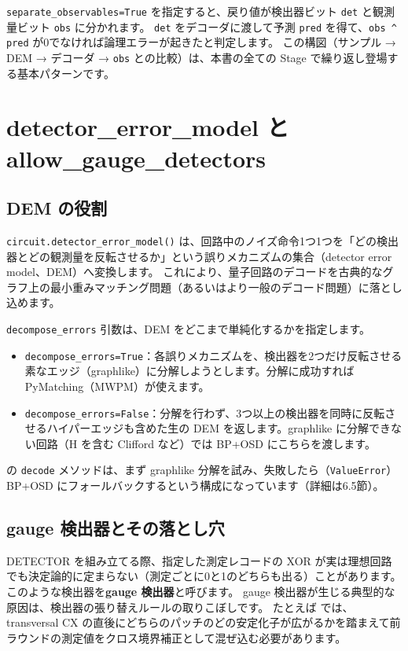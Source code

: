 \texttt{separate\_observables=True} を指定すると、戻り値が検出器ビット \texttt{det} と観測量ビット \texttt{obs} に分かれます。
\texttt{det} をデコーダに渡して予測 \texttt{pred} を得て、\verb|obs ^ pred| が0でなければ論理エラーが起きたと判定します。
この構図（サンプル → DEM → デコーダ → \texttt{obs} との比較）は、本書の全ての Stage で繰り返し登場する基本パターンです。

\section{detector\_error\_model と allow\_gauge\_detectors}\label{sec:dem_gauge}

\subsection{DEM の役割}

\texttt{circuit.detector\_error\_model()} は、回路中のノイズ命令1つ1つを「どの検出器とどの観測量を反転させるか」という誤りメカニズムの集合（detector error model、DEM）へ変換します。
これにより、量子回路のデコードを古典的なグラフ上の最小重みマッチング問題（あるいはより一般のデコード問題）に落とし込めます。

\texttt{decompose\_errors} 引数は、DEM をどこまで単純化するかを指定します。

\begin{itemize}
  \item \texttt{decompose\_errors=True}：各誤りメカニズムを、検出器を2つだけ反転させる素なエッジ（graphlike）に分解しようとします。分解に成功すれば PyMatching（MWPM）が使えます。
  \item \texttt{decompose\_errors=False}：分解を行わず、3つ以上の検出器を同時に反転させるハイパーエッジも含めた生の DEM を返します。graphlike に分解できない回路（H を含む Clifford など）では BP+OSD にこちらを渡します。
\end{itemize}

 の \texttt{decode} メソッドは、まず graphlike 分解を試み、失敗したら（\texttt{ValueError}）BP+OSD にフォールバックするという構成になっています（詳細は6.5節）。

\subsection{gauge 検出器とその落とし穴}

DETECTOR を組み立てる際、指定した測定レコードの XOR が実は理想回路でも決定論的に定まらない（測定ごとに0と1のどちらも出る）ことがあります。
このような検出器を\textbf{gauge 検出器}と呼びます。
gauge 検出器が生じる典型的な原因は、検出器の張り替えルールの取りこぼしです。
たとえば  では、transversal CX の直後にどちらのパッチのどの安定化子が広がるかを踏まえて前ラウンドの測定値をクロス境界補正として混ぜ込む必要があります。


